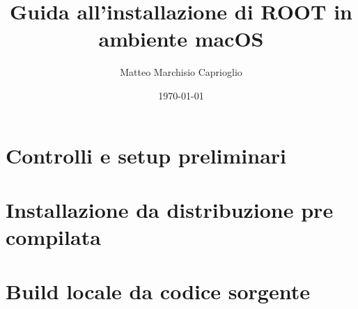 \documentclass[12pt,a4paper]{report}
\title{Guida all'installazione di ROOT in ambiente macOS}
\author{Matteo Marchisio Caprioglio}
\date{\today}
\begin{document}
\maketitle

\begin{abstract}
	
\end{abstract}

\newpage

\tableofcontents
\clearpage

\newpage

\section{Controlli e setup preliminari}
\label{sec:preliminari}


\section{Installazione da distribuzione pre compilata}
\label{sec:pre-comp}


\section{Build locale da codice sorgente}
\label{sec:build}



\newpage

\begin{comment}
\section{Documentazione}
\begin{itemize}
	\item \hyperref{https://root.cern}{}{}{Sito di ROOT - documentazione completa}
	\item \hyperref{https://root.cern/install/all_releases/}{}{}{Releases di ROOT}
	\item \hyperref{https://www.howtogeek.com/444596/how-to-change-the-default-shell-to-bash-in-macos-catalina/}{}{}{Come cambiare la shell di default di macOS}
	\item \hyperref{https://www.gnu.org/savannah-checkouts/gnu/bash/manual/bash.html#Controlling-the-Prompt}{}{}{Manuale comandi shell}
	\item \hyperref{https://wiki.gentoo.org/wiki/Vim/Guide}{}{}{Guida Vim}
\end{itemize}
\end{comment}



\end{document}
